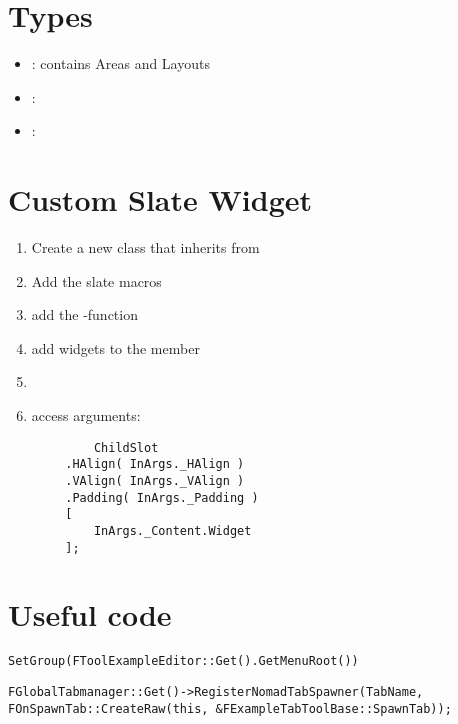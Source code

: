     \section{Types}
        \begin{itemize}
            \item {} : contains Areas and Layouts
            \item {} : 
            \item {} : 
        \end{itemize}

    
    \section{Custom Slate Widget}
        \begin{enumerate}
            \item Create a new class that inherits from 
            \item Add the slate macros
            \item add the -function
            \item add widgets to the  member
            \item 
            \item access arguments: 
        \end{enumerate}

        \begin{lstlisting}
            ChildSlot
        .HAlign( InArgs._HAlign )
        .VAlign( InArgs._VAlign )
        .Padding( InArgs._Padding )
        [
            InArgs._Content.Widget
        ];
        \end{lstlisting}


    \section{Useful code}
\begin{lstlisting}
SetGroup(FToolExampleEditor::Get().GetMenuRoot())
\end{lstlisting}

\begin{lstlisting}
FGlobalTabmanager::Get()->RegisterNomadTabSpawner(TabName, FOnSpawnTab::CreateRaw(this, &FExampleTabToolBase::SpawnTab));
\end{lstlisting}

